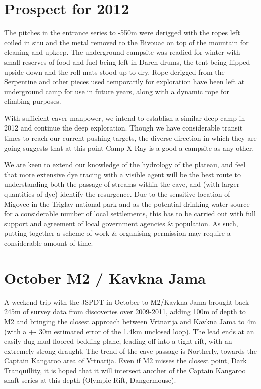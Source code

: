 \section{Prospect for 2012}\label{prospect-for-2012}

The pitches in the entrance series to -550m were derigged with the ropes
left coiled in situ and the metal removed to the Bivouac on top of the
mountain for cleaning and upkeep. The underground campsite was readied
for winter with small reserves of food and fuel being left in Daren
drums, the tent being flipped upside down and the roll mats stood up to
dry. Rope derigged from the Serpentine and other pieces used temporarily
for exploration have been left at underground camp for use in future
years, along with a dynamic rope for climbing purposes.

With sufficient caver manpower, we intend to establish a similar deep
camp in 2012 and continue the deep exploration. Though we have
considerable transit times to reach our current pushing targets, the
diverse direction in which they are going suggests that at this point
Camp X-Ray is a good a campsite as any other.

We are keen to extend our knowledge of the hydrology of the plateau, and
feel that more extensive dye tracing with a visible agent will be the
best route to understanding both the passage of streams within the cave,
and (with larger quantities of dye) identify the resurgence. Due to the
sensitive location of Migovec in the Triglav national park and as the
potential drinking water source for a considerable number of local
settlements, this has to be carried out with full support and agreement
of local government agencies \& population. As such, putting together a
scheme of work \& organising permission may require a considerable
amount of time.

\section{October M2 / Kavkna Jama}\label{october-m2-kavkna-jama}

A weekend trip with the JSPDT in October to M2/Kavkna Jama brought back
245m of survey data from discoveries over 2009-2011, adding 100m of
depth to M2 and bringing the closest approach between Vrtnarija and
Kavkna Jama to 4m (with a +- 30m estimated error of the 1.4km unclosed
loop). The lead ends at an easily dug mud floored bedding plane, leading
off into a tight rift, with an extremely strong draught. The trend of
the cave passage is Northerly, towards the Captain Kangaroo area of
Vrtnarija. Even if M2 misses the closest point, Dark Tranquillity, it is
hoped that it will intersect another of the Captain Kangaroo shaft
series at this depth (Olympic Rift, Dangermouse).

